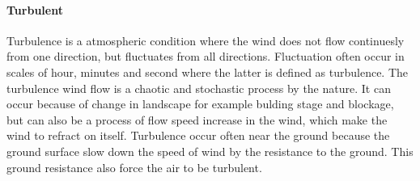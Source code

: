 \paragraph{Turbulent} Turbulence is a atmospheric condition where the wind does not flow continuesly from one direction, but fluctuates from all directions. Fluctuation often occur in scales of hour, minutes and second where the latter is defined as turbulence. The turbulence wind flow is a chaotic and stochastic process by the nature. It can occur because of change in landscape for example bulding stage and blockage, but can also be a process of flow speed increase in the wind, which make the wind to refract on itself. Turbulence occur often near the ground because the ground surface slow down the speed of wind by the resistance to the ground. This ground resistance also force the air to be turbulent.















